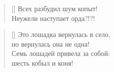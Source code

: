 \documentclass[a5paper,11pt]{memoir}
\begin{document}
\BgThispage

\newpage
\color{black}

\begin{verse}[\versewidth]
Всех разбудил шум копыт! \\
Неужели наступает орда?!?! \\
\end{verse}

\begin{verse}[\versewidth]
Это лошадка вернулась в село, \\
но вернулась она не одна! \\
Семь лошадей привела за собой: \\
шесть кобыл и коня! \\
\end{verse}
\end{document}
